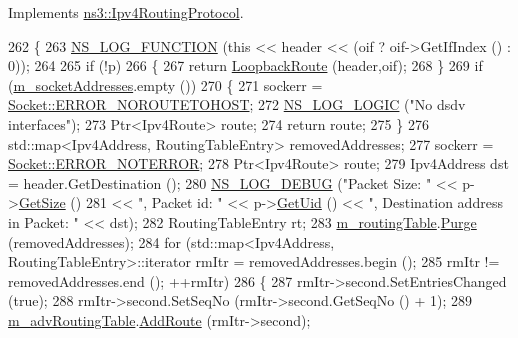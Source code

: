Implements \hyperlink{classns3_1_1Ipv4RoutingProtocol_a9c0e9b77772a4974c06ee4577fe60547}{ns3\+::\+Ipv4\+Routing\+Protocol}.


\begin{DoxyCode}
262 \{
263   \hyperlink{log-macros-disabled_8h_a90b90d5bad1f39cb1b64923ea94c0761}{NS\_LOG\_FUNCTION} (\textcolor{keyword}{this} << header << (oif ? oif->GetIfIndex () : 0));
264 
265   \textcolor{keywordflow}{if} (!p)
266     \{
267       \textcolor{keywordflow}{return} \hyperlink{classns3_1_1dsdv_1_1RoutingProtocol_aadc3f2072721211ad452bcbe49762420}{LoopbackRoute} (header,oif);
268     \}
269   \textcolor{keywordflow}{if} (\hyperlink{classns3_1_1dsdv_1_1RoutingProtocol_a9f3be507604655079b145f063cf036fd}{m\_socketAddresses}.empty ())
270     \{
271       sockerr = \hyperlink{classns3_1_1Socket_ada1328c5ae0c28cb2a982caf8f6d6ccaa0f8ecb5a4ddbce3bade35fa12c3d49e8}{Socket::ERROR\_NOROUTETOHOST};
272       \hyperlink{group__logging_ga88acd260151caf2db9c0fc84997f45ce}{NS\_LOG\_LOGIC} (\textcolor{stringliteral}{"No dsdv interfaces"});
273       Ptr<Ipv4Route> route;
274       \textcolor{keywordflow}{return} route;
275     \}
276   std::map<Ipv4Address, RoutingTableEntry> removedAddresses;
277   sockerr = \hyperlink{classns3_1_1Socket_ada1328c5ae0c28cb2a982caf8f6d6ccaaa7eb006d73c5ad0117c5591fcb3469f7}{Socket::ERROR\_NOTERROR};
278   Ptr<Ipv4Route> route;
279   Ipv4Address dst = header.GetDestination ();
280   \hyperlink{group__logging_ga413f1886406d49f59a6a0a89b77b4d0a}{NS\_LOG\_DEBUG} (\textcolor{stringliteral}{"Packet Size: "} << p->\hyperlink{classns3_1_1Packet_a462855c9929954d4301a4edfe55f4f1c}{GetSize} ()
281                                 << \textcolor{stringliteral}{", Packet id: "} << p->\hyperlink{classns3_1_1Packet_a1f212c825b50e54d94f5b9ae99592e6a}{GetUid} () << \textcolor{stringliteral}{", Destination address in
       Packet: "} << dst);
282   RoutingTableEntry rt;
283   \hyperlink{classns3_1_1dsdv_1_1RoutingProtocol_acc4cee466c2591e35f508ce58097a00e}{m\_routingTable}.\hyperlink{classns3_1_1dsdv_1_1RoutingTable_ad4e2b213772381511453c5ec8c968e68}{Purge} (removedAddresses);
284   \textcolor{keywordflow}{for} (std::map<Ipv4Address, RoutingTableEntry>::iterator rmItr = removedAddresses.begin ();
285        rmItr != removedAddresses.end (); ++rmItr)
286     \{
287       rmItr->second.SetEntriesChanged (\textcolor{keyword}{true});
288       rmItr->second.SetSeqNo (rmItr->second.GetSeqNo () + 1);
289       \hyperlink{classns3_1_1dsdv_1_1RoutingProtocol_adce3cf63777d6099e58caa1cb198282c}{m\_advRoutingTable}.\hyperlink{classns3_1_1dsdv_1_1RoutingTable_a4eed9bac83e90f1db01e414892e10b9b}{AddRoute} (rmItr->second);

\end{DoxyCode}
